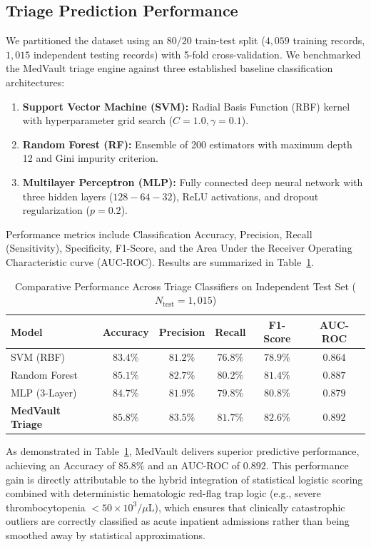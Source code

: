 \documentclass[conference]{IEEEtran}
\begin{document}
\subsection{Triage Prediction Performance}
We partitioned the dataset using an $80/20$ train-test split ($4,059$ training records, $1,015$ independent testing records) with 5-fold cross-validation. We benchmarked the MedVault triage engine against three established baseline classification architectures:
\begin{enumerate}
    \item \textbf{Support Vector Machine (SVM):} Radial Basis Function (RBF) kernel with hyperparameter grid search ($C = 1.0, \gamma = 0.1$).
    \item \textbf{Random Forest (RF):} Ensemble of 200 estimators with maximum depth 12 and Gini impurity criterion.
    \item \textbf{Multilayer Perceptron (MLP):} Fully connected deep neural network with three hidden layers ($128 - 64 - 32$), ReLU activations, and dropout regularization ($p=0.2$).
\end{enumerate}

Performance metrics include Classification Accuracy, Precision, Recall (Sensitivity), Specificity, F1-Score, and the Area Under the Receiver Operating Characteristic curve (AUC-ROC). Results are summarized in Table~\ref{tab:ml_benchmarks}.

\begin{table}[h]
\centering
\caption{Comparative Performance Across Triage Classifiers on Independent Test Set ($N_{\text{test}} = 1,015$)}
\label{tab:ml_benchmarks}
\begin{tabularx}{\columnwidth}{l c c c c c}
\toprule
\textbf{Model} & \textbf{Accuracy} & \textbf{Precision} & \textbf{Recall} & \textbf{F1-Score} & \textbf{AUC-ROC} \\
\midrule
SVM (RBF) & $83.4\%$ & $81.2\%$ & $76.8\%$ & $78.9\%$ & $0.864$ \\
Random Forest & $85.1\%$ & $82.7\%$ & $80.2\%$ & $81.4\%$ & $0.887$ \\
MLP (3-Layer) & $84.7\%$ & $81.9\%$ & $79.8\%$ & $80.8\%$ & $0.879$ \\
\textbf{MedVault Triage} & $\mathbf{85.8\%}$ & $\mathbf{83.5\%}$ & $\mathbf{81.7\%}$ & $\mathbf{82.6\%}$ & $\mathbf{0.892}$ \\
\bottomrule
\end{tabularx}
\end{table}

As demonstrated in Table~\ref{tab:ml_benchmarks}, MedVault delivers superior predictive performance, achieving an Accuracy of $85.8\%$ and an AUC-ROC of $0.892$. This performance gain is directly attributable to the hybrid integration of statistical logistic scoring combined with deterministic hematologic red-flag trap logic (e.g., severe thrombocytopenia $<50\times 10^3/\mu\text{L}$), which ensures that clinically catastrophic outliers are correctly classified as acute inpatient admissions rather than being smoothed away by statistical approximations.
\end{document}

